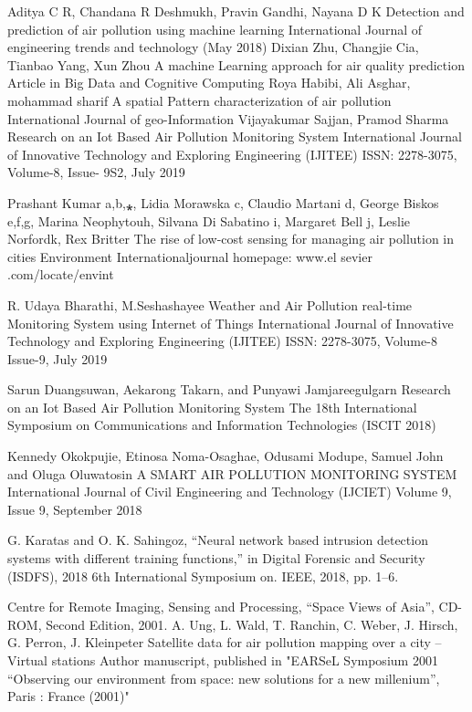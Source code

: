 \documentclass[12pt]{report}	%
\begin{document}
\begin{thebibliography}{99}

Aditya C R, Chandana R Deshmukh, Pravin Gandhi, Nayana D K Detection and prediction of air
pollution using machine learning International Journal of engineering trends and technology (May
2018)
Dixian Zhu, Changjie Cia, Tianbao Yang, Xun Zhou A machine Learning approach for air quality
prediction Article in Big Data and Cognitive Computing
Roya Habibi, Ali Asghar, mohammad sharif A spatial Pattern characterization of air pollution
International Journal of geo-Information
Vijayakumar Sajjan, Pramod Sharma Research on an Iot Based Air Pollution Monitoring System
International Journal of Innovative Technology and Exploring Engineering (IJITEE) ISSN:
2278-3075, Volume-8, Issue- 9S2, July 2019

Prashant Kumar a,b,⁎, Lidia Morawska c, Claudio Martani d, George Biskos e,f,g, Marina
Neophytouh, Silvana Di Sabatino i, Margaret Bell j, Leslie Norfordk, Rex Britter The rise of low-cost
sensing for managing air pollution in cities Environment Internationaljournal homepage: www.el
sevier .com/locate/envint

 R. Udaya Bharathi, M.Seshashayee Weather and Air Pollution real-time Monitoring System using Internet of Things International Journal of Innovative Technology and Exploring Engineering (IJITEE) ISSN: 2278-3075, Volume-8 Issue-9, July 2019


Sarun Duangsuwan, Aekarong Takarn, and Punyawi Jamjareegulgarn Research on an Iot Based Air Pollution Monitoring System The 18th International Symposium on Communications and Information Technologies (ISCIT 2018)


Kennedy Okokpujie, Etinosa Noma-Osaghae, Odusami Modupe, Samuel John and Oluga Oluwatosin A SMART AIR POLLUTION MONITORING SYSTEM International Journal of Civil Engineering and Technology (IJCIET) Volume 9, Issue 9, September 2018


G. Karatas and O. K. Sahingoz, “Neural network based intrusion
detection systems with different training functions,” in Digital Forensic
and Security (ISDFS), 2018 6th International Symposium on. IEEE,
2018, pp. 1–6.

Centre for Remote Imaging, Sensing and Processing,
“Space Views of Asia”, CD-ROM, Second Edition,
2001.
 A. Ung, L. Wald, T. Ranchin, C. Weber, J. Hirsch, G. Perron, J. Kleinpeter Satellite data for air pollution mapping over a city – Virtual stations Author manuscript, published in "EARSeL Symposium 2001 “Observing our environment from space: new solutions for a new millenium”, Paris : France (2001)"


\end{thebibliography}
\end{document}
